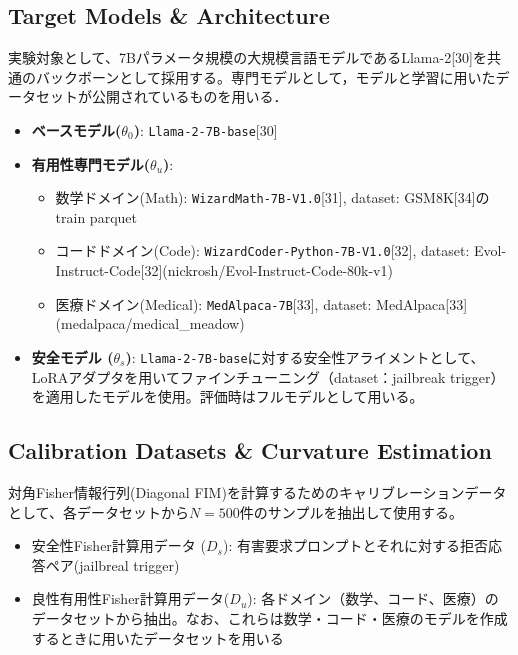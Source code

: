 \documentclass{article}
\begin{document}
\subsection{Target Models \& Architecture}
実験対象として、7Bパラメータ規模の大規模言語モデルであるLlama-2[30]を共通のバックボーンとして採用する。専門モデルとして，モデルと学習に用いたデータセットが公開されているものを用いる．


\begin{itemize}
\item \textbf{ベースモデル($\theta_0$)}: \texttt{Llama-2-7B-base}[30]
\item \textbf{有用性専門モデル($\theta_u$)}:
\begin{itemize}
  \item 数学ドメイン(Math): \texttt{WizardMath-7B-V1.0}[31], dataset: GSM8K[34]のtrain parquet
  \item コードドメイン(Code): \texttt{WizardCoder-Python-7B-V1.0}[32], dataset: Evol-Instruct-Code[32](nickrosh/Evol-Instruct-Code-80k-v1)
  \item 医療ドメイン(Medical): \texttt{MedAlpaca-7B}[33], dataset: MedAlpaca[33](medalpaca/medical\_meadow)
\end{itemize}
\item \textbf{安全モデル ($\theta_s$)}: \texttt{Llama-2-7B-base}に対する安全性アライメントとして、LoRAアダプタを用いてファインチューニング（dataset：jailbreak trigger）を適用したモデルを使用。評価時はフルモデルとして用いる。
\end{itemize}

\subsection{Calibration Datasets \& Curvature Estimation}
\label{app:calibration_datasets}
対角Fisher情報行列(Diagonal FIM)を計算するためのキャリブレーションデータとして、各データセットから$N=500$件のサンプルを抽出して使用する。
\begin{itemize}
\item 安全性Fisher計算用データ ($D_s$): 有害要求プロンプトとそれに対する拒否応答ペア(jailbreal trigger)
\item 良性有用性Fisher計算用データ($D_u$): 各ドメイン（数学、コード、医療）のデータセットから抽出。なお、これらは数学・コード・医療のモデルを作成するときに用いたデータセットを用いる
\end{itemize}
\end{document}
